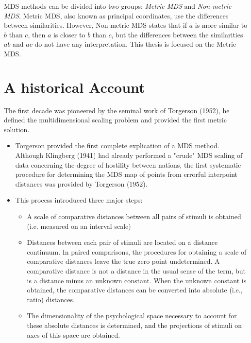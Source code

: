 \documentclass[11pt]{report}
\begin{document}
\indent MDS methods can be divided into two groups: \textit{Metric MDS} and
\textit{Non-metric MDS}. Metric MDS, also known as principal coordinates, use
the differences between similarities. However, Non-metric MDS states that if $a$
is more similar to $b$ than $c$, then $a$ is closer to $b$ than $c$, but the
differences between the similarities $ab$ and $ac$ do not have any 
interpretation. This thesis is focused on the Metric MDS.

\section{A historical Account}
The first decade was pioneered by the seminal work of Torgerson (1952), he 
defined the multidimensional scaling problem and provided the first metric 
solution. 

\begin{itemize}
\item Torgerson\cite{Torgerson1952} provided the first complete explication 
of a MDS method. Although Klingberg (1941) had already performed a "crude" 
MDS scaling of data concerning the degree of hostility between nations, the 
first systematic procedure for determining the MDS map of points from 
errorful interpoint distances was provided by Torgerson (1952)\cite{Torgerson1952}.

\item This process introduced three major steps:

\begin{itemize}

\item A scale of comparative distances between all pairs of stimuli is obtained 
(i.e. measured on an interval scale)

\item Distances between each pair of stimuli are located on a distance continuum.
In paired comparisons, the procedures for obtaining a scale of comparative 
distances leave the true zero point undetermined. A comparative distance is 
not a distance in the usual sense of the term, but is a distance minus an 
unknown constant. When the unknown constant is obtained, the comparative 
distances can be converted into absolute (i.e., ratio) distances. 

\item The dimensionality of the psychological space necessary to account for 
these absolute distances is determined, and the projections of stimuli on 
axes of this space are obtained.

\end{itemize}
\end{itemize}
 
\end{document}
